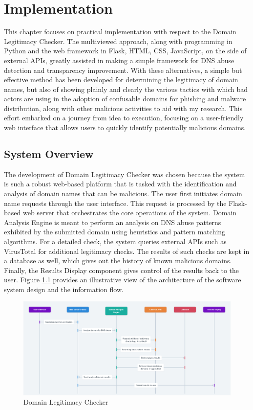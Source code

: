 \chapter{Implementation}


This chapter focuses on practical implementation with respect to the Domain Legitimacy Checker. The multiviewed approach, along with programming in Python and the web framework in Flask, HTML, CSS, JavaScript, on the side of external APIs, greatly assisted in making a simple framework for DNS abuse detection and transparency improvement. With these alternatives, a simple but effective method has been developed for determining the legitimacy of domain names, but also of showing plainly and clearly the various tactics with which bad actors are using in the adoption of confusable domains for phishing and malware distribution, along with other malicious activities to aid with my research. This effort embarked on a journey from idea to execution, focusing on a user-friendly web interface that allows users to quickly identify potentially malicious domains. 

\section{System Overview}

The development of Domain Legitimacy Checker was chosen because the system is such a robust web-based platform that is tasked with the identification and analysis of domain names that can be malicious. The user first initiates domain name requests through the user interface. This request is processed by the Flask-based web server that orchestrates the core operations of the system. Domain Analysis Engine is meant to perform an analysis on DNS abuse patterns exhibited by the submitted domain using heuristics and pattern matching algorithms. For a detailed check, the system queries external APIs such as VirusTotal for additional legitimacy checks. The results of such checks are kept in a database as well, which gives out the history of known malicious domains. Finally, the Results Display component gives control of the results back to the user. Figure \ref{fig:figfig} provides an illustrative view of the architecture of the software system design and the information flow.


\begin{figure}[H]
\captionsetup{font= footnotesize}
    \centering
    \includegraphics[width=1\linewidth]{project/DNS Abuse Transparency System.png}
    \caption{Domain Legitimacy Checker}
    \label{fig:figfig}
\end{figure}

